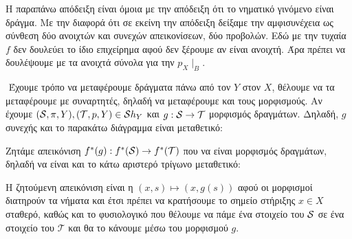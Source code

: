 \begin{remark}
    Η παραπάνω απόδειξη είναι όμοια με την απόδειξη ότι το νηματικό γινόμενο είναι δράγμα. Με την διαφορά ότι σε εκείνη την απόδειξη δείξαμε την αμφισυνέχεια ως σύνθεση δύο ανοιχτών και συνεχών απεικονίσεων, δύο προβολών. Εδώ με την τυχαία $f$ δεν δουλεύει το ίδιο επιχείρημα αφού δεν ξέρουμε αν είναι ανοιχτή. Άρα πρέπει να δουλέψουμε με τα ανοιχτά σύνολα για την $p_X\mid_B$.
\end{remark}


$ $\newline
Έχουμε τρόπο να μεταφέρουμε δράγματα πάνω από τον $Y$ στον $X$, θέλουμε να τα μεταφέρουμε με συναρτητές, δηλαδή να μεταφέρουμε και τους μορφισμούς. Αν έχουμε $(\mathcal{S},\pi,Y), (\mathcal{T},p,Y) \in \mathcal{S} h_Y$ και $g:\mathcal{S} \rightarrow \mathcal{T}$ μορφισμός δραγμάτων. Δηλαδή, $g$ συνεχής και το παρακάτω διάγραμμα είναι μεταθετικό:
\begin{figure}[H]
    \centering
\end{figure}
\noindent Ζητάμε απεικόνιση $f^*(g): f^*(\mathcal{S}) \rightarrow f^*(\mathcal{T})$ που να είναι μορφισμός δραγμάτων, δηλαδή να είναι και το κάτω αριστερό τρίγωνο μεταθετικό:
\begin{figure}[H]
    \centering
\end{figure}

\noindent Η ζητούμενη απεικόνιση είναι η $(x,s)\longmapsto (x,g(s))$ αφού οι μορφισμοί διατηρούν τα νήματα και έτσι πρέπει να κρατήσουμε το σημείο στήριξης $x \in X$ σταθερό, καθώς και το φυσιολογικό που θέλουμε να πάμε ένα στοιχείο του $\mathcal{S}$ σε ένα στοιχείο του $\mathcal{T}$ και θα το κάνουμε μέσω του μορφισμού $g$.

